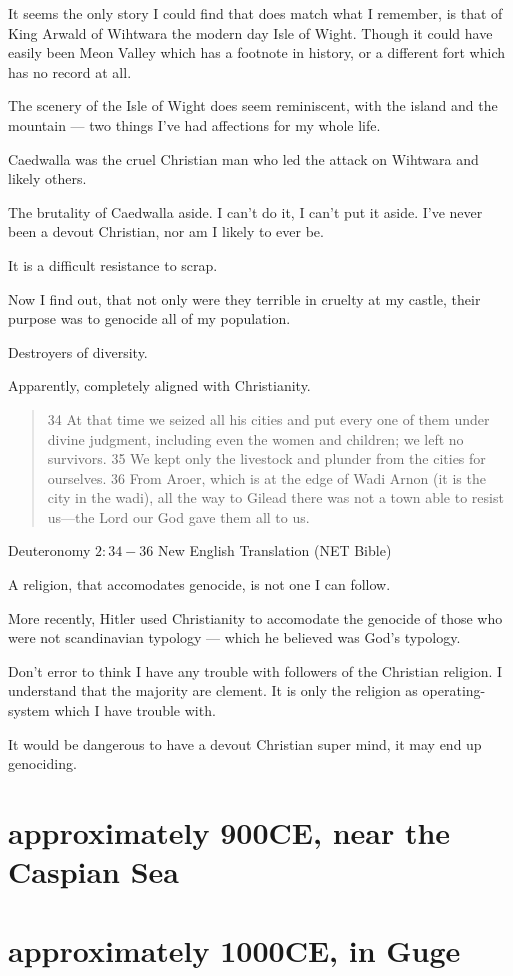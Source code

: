 It seems the only story I could find that does match what I remember, is that of
King Arwald of Wihtwara the modern day Isle of Wight.  
Though it could have easily been Meon Valley which has a footnote in history, 
or a different fort which has no record at all. 

The scenery of the Isle of Wight does seem reminiscent, with the island and the
mountain --- two things I've had affections for my whole life. 

Caedwalla was the cruel Christian man who led the attack on Wihtwara and likely
others.

The brutality of Caedwalla aside. I can't do it, I can't put it aside. 
I've never been a devout Christian, nor am I likely to ever be. 

It is a difficult resistance to scrap. 

Now I find out, that not only were they terrible in cruelty at my castle,
their purpose was to genocide all of my population.

Destroyers of diversity. 

Apparently, completely aligned with Christianity. 

\blockquote{34 At that time we seized all his cities and put every one of them 
under divine judgment, including even the women and children; we left no 
survivors. 35 We kept only the livestock and plunder from the cities for 
ourselves. 36 From Aroer, which is at the edge of Wadi Arnon (it is the city in
 the wadi), all the way to Gilead there was not a town able to resist us—the 
Lord our God gave them all to us.}{Deuteronomy $2:34-36$ New English Translation
(NET Bible)}
 
A religion, that accomodates genocide, is not one I can follow.

More recently, Hitler used Christianity\cite{christianhitler} to accomodate 
the genocide of those who were not scandinavian typology --- which he believed
was God's typology.

Don't error to think I have any trouble with followers of the Christian
religion. I understand that the majority are clement. It is only the religion as
operating-system which I have trouble with.

It would be dangerous to have a devout Christian super mind,
it may end up genociding.
\chapter{approximately 900CE, near the Caspian Sea}
\chapter{approximately 1000CE, in Guge}
